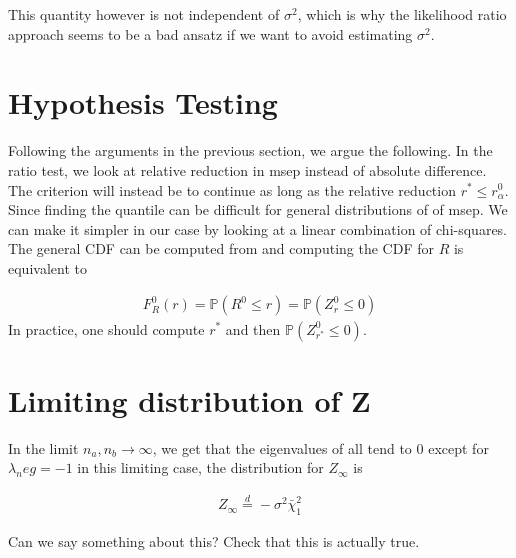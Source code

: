 \documentclass{article}
\theoremstyle{definition}
\theoremstyle{remark}
\renewcommand{\P}{\mathbb{P}}  %
\newcommand{\eqdis}{\stackrel{d}{=}}
\begin{document}
This quantity however is not independent of $\sigma^2$, which is why the likelihood ratio approach seems to be a bad ansatz if we want to avoid estimating $\sigma^2$.

\section{Hypothesis Testing}
Following the arguments in the previous section, we argue the following. In the
ratio test, we look at relative reduction in msep instead of absolute
difference. The criterion will instead be to continue as long as the relative
reduction $r^* \leq r^0_\alpha$. Since finding the quantile can be difficult
for general distributions of of msep. We can make it simpler in our case by
looking at a linear combination of chi-squares. The general CDF can be computed
from \cite{pm_linearchi} and computing the CDF for $R $ is equivalent to

\begin{align*}
	F_R^0(r) = \P(R^0 \leq r) = \P(Z_r^0 \leq 0)
\end{align*}
In practice, one should compute $ r^* $ and then $ \P(Z_{r^*}^0 \leq 0) $.


\section{Limiting distribution of Z}
In the limit $ n_a, n_b \to \infty  $, we get that the eigenvalues of all tend
to $ 0 $ except for $ \lambda_neg = -1 $ in this limiting case, the
distribution for $ Z_\infty $ is

\begin{align*}
	Z_\infty \eqdis -\sigma^2 \bar \chi_1^2
\end{align*}

Can we say something about this? Check that this is actually true.
\end{document}
